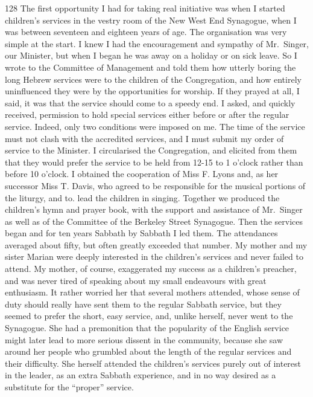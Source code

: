\begin{tp}{128}
The first opportunity I had for taking real initiative
was when I started children’s services in the vestry room
of the New West End Synagogue, when I was between
seventeen and eighteen years of age. The organisation
was very simple at the start. I knew I had the encouragement
and sympathy of Mr.\ Singer, our Minister, but
when I began he was away on a holiday or on sick leave.
So I wrote to the Committee of Management and told them
how utterly boring the long Hebrew services were to the
children of the Congregation, and how entirely
uninfluenced they were by the opportunities for worship.
If they prayed at all, I said, it was that the service should
come to a speedy end. I asked, and quickly received,
permission to hold special services either before or after
the regular service. Indeed, only two conditions were
imposed on me. The time of the service must not clash
with the accredited services, and I must submit my order
of service to the Minister. I circularised the Congregation,
and elicited from them that they would prefer
the service to be held from 12-15 to 1 o'clock
rather than before 10 o’clock. I obtained the
cooperation of Miss F. Lyons and, as her successor
Miss T. Davis, who agreed to be responsible for
the musical portions of the liturgy, and to. lead
the children in singing. Together we produced the
children’s hymn and prayer book, with the support and
assistance of Mr.\ Singer as well as of the Committee of the
Berkeley Street Synagogue. Then the services began
and for ten years Sabbath by Sabbath I led them. The
attendances averaged about fifty, but often greatly
exceeded that number. My mother and my sister Marian
were deeply interested in the children’s services and
never failed to attend. My mother, of course, exaggerated
my success as a children’s preacher, and was never
tired of speaking about my small endeavours with great
enthusiasm. It rather worried her that several mothers
attended, whose sense of duty should really have sent
them to the regular Sabbath service, but they seemed to
prefer the short, easy service, and, unlike herself, never
went to the Synagogue. She had a premonition that the
popularity of the English service might later lead to
more serious dissent in the community, because she saw
around her people who grumbled about the length of the
regular services and their difficulty. She herself attended
the children’s services purely out of interest in the leader,
as an extra Sabbath experience, and in no way desired
as a substitute for the “proper” service.
\end{tp}

